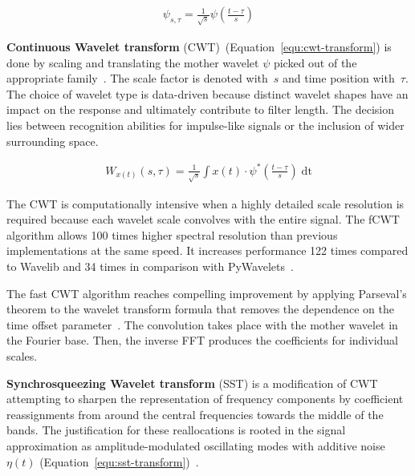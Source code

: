 \begin{ceqn}\begin{align}
\psi_{s, \tau} = \frac{1}{\sqrt{s}}\psi\left(\frac{t - \tau}{s}\right)
\label{equ:mother-wavelet}
\end{align}\end{ceqn}

\textbf{Continuous Wavelet transform} (CWT)~(Equation~\ref{equ:cwt-transform}) is done by scaling and translating the mother wavelet $\psi$ picked out of the appropriate family~\cite{nandi_condition_2019}. The scale factor is denoted with~$s$ and time position with~$\tau$. The choice of wavelet type is data-driven because distinct wavelet shapes have an impact on the response and ultimately contribute to filter length. The decision lies between recognition abilities for impulse-like signals or the inclusion of wider surrounding space.

\begin{ceqn}\begin{align}
W_{x(t)}(s, \tau) = \frac{1}{\sqrt{s}}\int x(t) \cdot \psi^*\left(\frac{t - \tau}{s}\right)\;\mathrm{dt}
\label{equ:cwt-transform}
\end{align}\end{ceqn}

The CWT is computationally intensive when a highly detailed scale resolution is required because each wavelet scale convolves with the entire signal. The fCWT algorithm allows 100 times higher spectral resolution than previous implementations at the same speed. It increases performance 122 times compared to Wavelib and 34 times in comparison with PyWavelets~\cite{arts_fast_2022}. 

The fast CWT algorithm reaches compelling improvement by applying Parseval's theorem to the wavelet transform formula that removes the dependence on the time offset parameter~\cite{arts_fast_2022}. The convolution takes place with the mother wavelet in the Fourier base. Then, the inverse FFT produces the coefficients for individual scales.

\textbf{Synchrosqueezing Wavelet transform} (SST) is a modification of CWT attempting to sharpen the representation of frequency components by coefficient reassignments from around the central frequencies towards the middle of the bands. The justification for these reallocations is rooted in the signal approximation as amplitude-modulated oscillating modes with additive noise $\eta(t)$ (Equation~\ref{equ:sst-transform})~\cite{herrera_applications_2014}.

